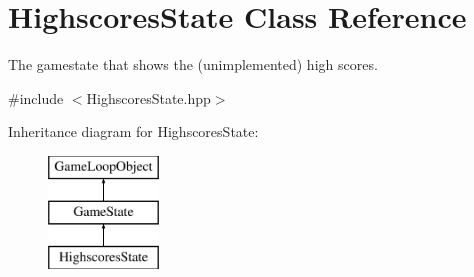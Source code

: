 \hypertarget{class_highscores_state}{}\section{Highscores\+State Class Reference}
\label{class_highscores_state}


The gamestate that shows the (unimplemented) high scores.  




{\ttfamily \#include $<$Highscores\+State.\+hpp$>$}

Inheritance diagram for Highscores\+State\+:\begin{figure}[H]
\begin{center}
\leavevmode
\includegraphics[height=3.000000cm]{class_highscores_state}
\end{center}
\end{figure}
